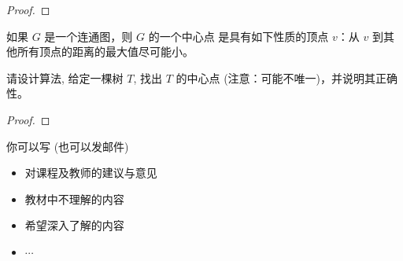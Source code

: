 \documentclass[a4paper, justified]{tufte-handout}
\begin{document}
\begin{proof}
\end{proof}

\begin{problem}[树的中心点]
  如果 $G$ 是一个连通图，则 $G$ 的一个中心点
  是具有如下性质的顶点 $v$：从 $v$ 到其他所有顶点的距离的最大值尽可能小。

  \noindent 请设计算法, 给定一棵树 $T$, 找出 $T$ 的中心点
  (注意：可能不唯一)，并说明其正确性。
\end{problem}

\begin{proof}
\end{proof}

\beginoptional
\begin{problem}[谍影重重]
\end{problem}

\begincorrection

\beginfb

你可以写 (也可以发邮件)
\begin{itemize}
  \item 对课程及教师的建议与意见
  \item 教材中不理解的内容
  \item 希望深入了解的内容
  \item $\cdots$
\end{itemize}
\end{document}
